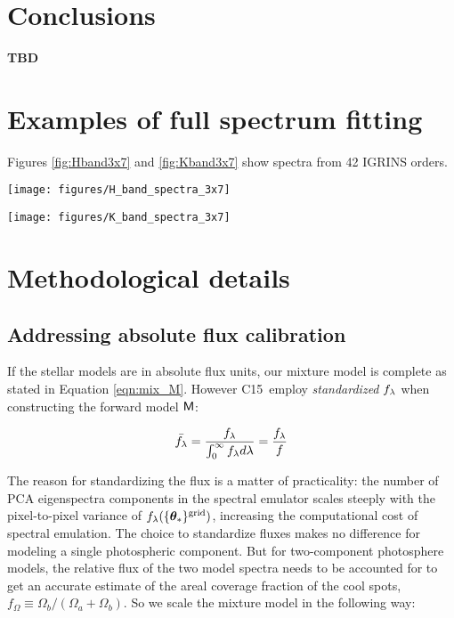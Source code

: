 \documentclass[twocolumn]{emulateapj}%
\newcommand{\iancze}{{\sc C15}}
\begin{document}
\section{Conclusions}
{\bf TBD}

\clearpage
\pagebreak


\appendix

\section{Examples of full spectrum fitting}

Figures \ref{fig:Hband3x7} and \ref{fig:Kband3x7} show spectra from 42 IGRINS orders.


\begin{figure*}
 \centering
 \texttt{[image: figures/H\_band\_spectra\_3x7]}
 \caption{IGRINS Orders 94 and $99-119$.  Note that the $y-$axis is on a logarithmic scale.  The red line is the cool photosphere while the blue line is the hot photosphere.  The purple line is the composite mixture model.}
 \label{fig:Hband3x7}
\end{figure*}

\begin{figure*}
 \centering
 \texttt{[image: figures/K\_band\_spectra\_3x7]}
 \caption{IGRINS Orders $73-93$.  Note that the $y-$axis is on a logarithmic scale.  Cools are the same as Figure \ref{fig:Hband3x7}}
 \label{fig:Kband3x7}
\end{figure*}


\section{Methodological details}
\label{methods-details}

\subsection{Addressing absolute flux calibration}
If the stellar models are in absolute flux units, our mixture model is complete as stated in Equation \ref{eqn:mix_M}.  However \iancze\ employ \emph{standardized} $f_\lambda$ when constructing the forward model $\mathsf{M}$:


\begin{eqnarray} \label{eqn:normalization}
\bar {f_\lambda} = \frac{f_\lambda}{\int_{0}^{\infty} f_\lambda d\lambda} = \frac{f_\lambda}{f}
\end{eqnarray}

The reason for standardizing the flux is a matter of practicality: the number of PCA eigenspectra components in the spectral emulator scales steeply with the pixel-to-pixel variance of $f_{\lambda}(\{{\bm \theta}_{\ast}\}^\textrm{grid})$, increasing the computational cost of spectral emulation.  The choice to standardize fluxes makes no difference for modeling a single photospheric component.  But for two-component photosphere models, the relative flux of the two model spectra needs to be accounted for to get an accurate estimate of the areal coverage fraction of the cool spots, $f_{\Omega} \equiv \Omega_b/(\Omega_a+\Omega_b)$.  So we scale the mixture model in the following way:
\end{document}
